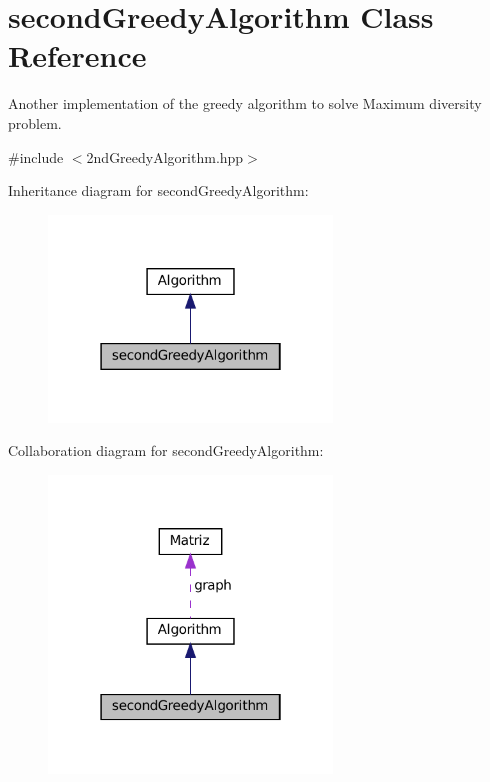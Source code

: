 \hypertarget{classsecondGreedyAlgorithm}{}\section{second\+Greedy\+Algorithm Class Reference}
\label{classsecondGreedyAlgorithm}


Another implementation of the greedy algorithm to solve Maximum diversity problem.  




{\ttfamily \#include $<$2nd\+Greedy\+Algorithm.\+hpp$>$}



Inheritance diagram for second\+Greedy\+Algorithm\+:
\nopagebreak
\begin{figure}[H]
\begin{center}
\leavevmode
\includegraphics[width=214pt]{classsecondGreedyAlgorithm__inherit__graph}
\end{center}
\end{figure}


Collaboration diagram for second\+Greedy\+Algorithm\+:
\nopagebreak
\begin{figure}[H]
\begin{center}
\leavevmode
\includegraphics[width=214pt]{classsecondGreedyAlgorithm__coll__graph}
\end{center}
\end{figure}
